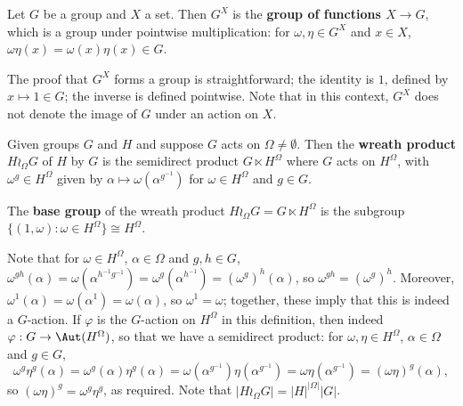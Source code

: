 \begin{definition}\label{def:function_group}
    Let $G$ be a group and $X$ a set. Then $G^X$ is the \textbf{group of functions $X \to G$}, which is a group under pointwise multiplication: for $\omega,\eta \in G^X$ and $x \in X$, $\omega\eta(x) = \omega(x)\eta(x) \in G$.
\end{definition}

The proof that $G^X$ forms a group is straightforward; the identity is $1$, defined by $x \mapsto 1 \in G$; the inverse is defined pointwise. Note that in this context, $G^X$ does not denote the image of $G$ under an action on $X$.

\begin{definition}\label{def:wreath_product}
    Given groups $G$ and $H$ and suppose $G$ acts on $\Omega \neq \emptyset$. Then the \textbf{wreath product} $H \wr_\Omega G$ of $H$ by $G$ is the semidirect product $G \ltimes H^\Omega$ where $G$ acts on $H^\Omega$, with $\omega^g \in H^\Omega$ given by $\alpha \mapsto \omega(\alpha^{g^{-1}})$ for $\omega \in H^\Omega$ and $g \in G$.

    The \textbf{base group} of the wreath product $H \wr_\Omega G = G \ltimes H^\Omega$ is the subgroup $\{(1,\omega) : \omega \in H^\Omega\} \cong H^\Omega$.
\end{definition}

Note that for $\omega \in H^\Omega$, $\alpha \in \Omega$ and $g,h \in G$, $\omega^{gh}(\alpha) = \omega(\alpha^{h^{-1}g^{-1}}) = \omega^g(\alpha^{h^{-1}}) = (\omega^g)^h(\alpha)$, so $\omega^{gh} = (\omega^g)^h$. Moreover, $\omega^1(\alpha) = \omega(\alpha^1) = \omega(\alpha)$, so $\omega^1 = \omega$; together, these imply that this is indeed a $G$-action. If $\varphi$ is the $G$-action on $H^\Omega$ in this definition, then indeed $\varphi : G \to \Aut(H^\Omega)$, so that we have a semidirect product: for $\omega,\eta \in H^\Omega$, $\alpha \in \Omega$ and $g \in G$,
$$\omega^g\eta^g(\alpha) = \omega^g(\alpha)\eta^g(\alpha) = \omega(\alpha^{g^{-1}})\eta(\alpha^{g^{-1}}) = \omega\eta(\alpha^{g^{-1}}) = (\omega\eta)^g(\alpha),$$
so $(\omega\eta)^g = \omega^g\eta^g$, as required. Note that $|H \wr_\Omega G| = |H|^{|\Omega|} |G|$.

